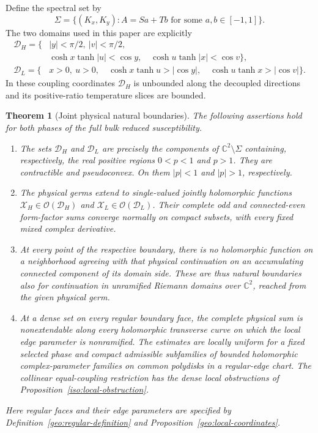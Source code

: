 \documentclass[11pt]{article}
\numberwithin{equation}{section}
\newtheorem{theorem}{Theorem}[section]
\theoremstyle{definition}
\newcommand{\C}{\mathbb C}
\renewcommand{\DH}{\mathcal D_H}
\newcommand{\DL}{\mathcal D_L}
\newcommand{\XH}{\mathcal X_H}
\newcommand{\XL}{\mathcal X_L}
\begin{document}
Define the spectral set by
\[
 \Sigma=\{(K_x,K_y):A=Sa+Tb\text{ for some }a,b\in[-1,1]\}.
\]
The two domains used in this paper are explicitly
\begin{align}
 \DH=\bigl\{&|y|<\pi/2,\ |v|<\pi/2,\nonumber\\[-2pt]
       &\cosh x\tanh|u|<\cos y,\quad
        \cosh u\tanh|x|<\cos v\bigr\},\label{main:DH}\\
 \DL=\bigl\{&x>0,\ u>0,\quad
       \cosh x\tanh u>|\cos y|,\quad
       \cosh u\tanh x>|\cos v|\bigr\}.\label{main:DL}
\end{align}
In these coupling coordinates \(\DH\) is unbounded along the
decoupled directions and its positive-ratio temperature slices are
bounded.

\begin{theorem}[Joint physical natural boundaries]\label{main:joint}
The following assertions hold for both phases of the full bulk reduced
susceptibility.
\begin{enumerate}
\item The sets \(\DH\) and \(\DL\) are precisely the components of
\(\C^2\setminus\Sigma\) containing, respectively, the real positive
regions \(0<p<1\) and \(p>1\). They are contractible and
pseudoconvex. On them \(|p|<1\) and \(|p|>1\), respectively.
\item The physical germs extend to single-valued jointly holomorphic
functions \(\XH\in\mathcal O(\DH)\) and
\(\XL\in\mathcal O(\DL)\). Their complete odd and connected-even
form-factor sums converge normally on compact subsets, with every
fixed mixed complex derivative.
\item At every point of the respective boundary, there is no
holomorphic function on a neighborhood agreeing with that physical
continuation on an accumulating connected component of its domain
side. These are thus natural boundaries also for continuation in
unramified Riemann domains over \(\C^2\), reached from the given
physical germ.
\item At a dense set on every regular boundary face, the complete
physical sum is
nonextendable along every holomorphic transverse curve on which the
local edge parameter is nonramified. The estimates are locally
uniform for a fixed selected phase and compact admissible subfamilies
of bounded holomorphic complex-parameter families on common polydisks
in a regular-edge chart. The collinear equal-coupling restriction
has the dense local obstructions of
Proposition~\ref{iso:local-obstruction}.
\end{enumerate}
Here regular faces and their edge parameters are specified by
Definition~\ref{geo:regular-definition} and
Proposition~\ref{geo:local-coordinates}.
\end{theorem}
\end{document}
